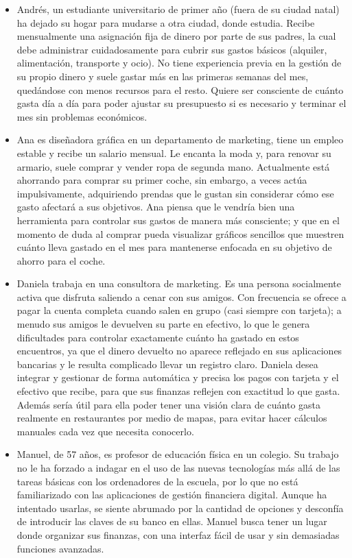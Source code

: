 \begin{itemize}
    \item Andrés, un estudiante universitario de primer año (fuera de su ciudad natal) ha dejado su hogar para mudarse a otra ciudad, donde estudia. Recibe mensualmente una asignación fija de dinero por parte de sus padres, la cual debe administrar cuidadosamente para cubrir sus gastos básicos (alquiler, alimentación, transporte y ocio). No tiene experiencia previa en la gestión de su propio dinero y suele gastar más en las primeras semanas del mes, quedándose con menos recursos para el resto. Quiere ser consciente de cuánto gasta día a día para poder ajustar su presupuesto si es necesario y terminar el mes sin problemas económicos.

    \item Ana es diseñadora gráfica en un departamento de marketing, tiene un empleo estable y recibe un salario mensual. Le encanta la moda y, para renovar su armario, suele comprar y vender ropa de segunda mano. Actualmente está ahorrando para comprar su primer coche, sin embargo, a veces actúa impulsivamente, adquiriendo prendas que le gustan sin considerar cómo ese gasto afectará a sus objetivos. Ana piensa que le vendría bien una herramienta para controlar sus gastos de manera más consciente; y que en el momento de duda al comprar pueda visualizar gráficos sencillos que muestren cuánto lleva gastado en el mes para mantenerse enfocada en su objetivo de ahorro para el coche.
    
    \item Daniela trabaja en una consultora de marketing. Es una persona socialmente activa que disfruta saliendo a cenar con sus amigos. Con frecuencia se ofrece a pagar la cuenta completa cuando salen en grupo (casi siempre con tarjeta); a menudo sus amigos le devuelven su parte en efectivo, lo que le genera dificultades para controlar exactamente cuánto ha gastado en estos encuentros, ya que el dinero devuelto no aparece reflejado en sus aplicaciones bancarias y le resulta complicado llevar un registro claro. Daniela desea integrar y gestionar de forma automática y precisa los pagos con tarjeta y el efectivo que recibe, para que sus finanzas reflejen con exactitud lo que gasta. Además sería útil para ella poder tener una visión clara de cuánto gasta realmente en restaurantes por medio de mapas, para evitar hacer cálculos manuales cada vez que necesita conocerlo.
    
    \item Manuel, de 57 años, es profesor de educación física en un colegio. Su trabajo no le ha forzado a indagar en el uso de las nuevas tecnologías más allá de las tareas básicas con los ordenadores de la escuela, por lo que no está familiarizado con las aplicaciones de gestión financiera digital. Aunque ha intentado usarlas, se siente abrumado por la cantidad de opciones y desconfía de introducir las claves de su banco en ellas. Manuel busca tener un lugar donde organizar sus finanzas, con una interfaz fácil de usar y sin demasiadas funciones avanzadas.
    
\end{itemize}

